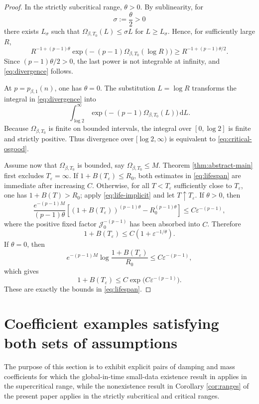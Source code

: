 \documentclass[11pt,reqno]{amsart}
\theoremstyle{definition}
\theoremstyle{remark}
\begin{document}
	\begin{proof}
		In the strictly subcritical range, $\theta>0$. By sublinearity, for
		$$
		\sigma:=\frac{\theta}{2}>0
		$$
		there exists $L_\sigma$ such that $\Omega_{\beta,T_0}(L)\leq\sigma L$ for $L\geq L_\sigma$. Hence, for sufficiently large $R$,
		$$
		R^{-1+(p-1)\theta}
		\exp\bigl(-(p-1)\Omega_{\beta,T_0}(\log R)\bigr)
		\geq R^{-1+(p-1)\theta/2}.
		$$
		Since $(p-1)\theta/2>0$, the last power is not integrable at infinity, and \eqref{eq:divergence} follows.
		
		At $p=p_{\beta,1}(n)$, one has $\theta=0$. The substitution $L=\log R$ transforms the integral in \eqref{eq:divergence} into
		$$
		\int_{\log2}^\infty
		\exp\bigl(-(p-1)\Omega_{\beta,T_0}(L)\bigr)\,\mathrm{d}L.
		$$
		Because $\Omega_{\beta,T_0}$ is finite on bounded intervals, the integral over $[0,\log2]$ is finite and strictly positive. Thus divergence over $[\log2,\infty)$ is equivalent to \eqref{eq:critical-osgood}.
		
		Assume now that $\Omega_{\beta,T_0}$ is bounded, say $\Omega_{\beta,T_0}\leq M$. Theorem \ref{thm:abstract-main} first excludes $T_\varepsilon=\infty$. If $1+B(T_\varepsilon)\leq R_0$, both estimates in \eqref{eq:lifespan} are immediate after increasing $C$. Otherwise, for all $T<T_\varepsilon$ sufficiently close to $T_\varepsilon$, one has $1+B(T)>R_0$; apply \eqref{eq:life-implicit} and let $T\uparrow T_\varepsilon$. If $\theta>0$, then
		$$
		\frac{e^{-(p-1)M}}{(p-1)\theta}
		\left[(1+B(T_\varepsilon))^{(p-1)\theta}-R_0^{(p-1)\theta}\right]
		\leq C\varepsilon^{-(p-1)},
		$$
		where the positive fixed factor $\mathcal J_0^{-(p-1)}$ has been absorbed into $C$. Therefore
		$$
		1+B(T_\varepsilon)
		\leq C\left(1+\varepsilon^{-1/\theta}\right).
		$$
		If $\theta=0$, then
		$$
		e^{-(p-1)M}\log\frac{1+B(T_\varepsilon)}{R_0}
		\leq C\varepsilon^{-(p-1)},
		$$
		which gives
		$$
		1+B(T_\varepsilon)
		\leq C\exp\bigl(C\varepsilon^{-(p-1)}\bigr).
		$$
		These are exactly the bounds in \eqref{eq:lifespan}.
	\end{proof}
	
	\section{Coefficient examples satisfying both sets of assumptions} \label{sec:examples}
	
	The purpose of this section is to exhibit explicit pairs of damping and mass coefficients for which the global-in-time small-data existence result in \cite[Theorem 3]{DGR2019} applies in the supercritical range, while the nonexistence result in Corollary \ref{cor:ranges} of the present paper applies in the strictly subcritical and critical ranges.
	
\end{document}
